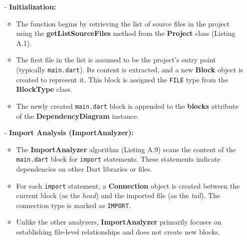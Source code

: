 \begin{itemize}
    \item[-] \textbf{Initialization:}
    \begin{itemize}
        \item The function begins by retrieving the list of source files in the project using the \textbf{getListSourceFiles} method from the \textbf{Project} class (Listing A.1).
        \item The first file in the list is assumed to be the project's entry point (typically \texttt{main.dart}). Its content is extracted, and a new \textbf{Block} object is created to represent it. This block is assigned the \texttt{FILE} type from the \textbf{BlockType} class.
        \item The newly created \texttt{main.dart} block is appended to the \textbf{blocks} attribute of the \textbf{DependencyDiagram} instance.
    \end{itemize}

    \item[-] \textbf{Import Analysis (ImportAnalyzer):}
    \begin{itemize}
        \item The \textbf{ImportAnalyzer} algorithm (Listing A.9) scans the content of the \texttt{main.dart} block for \texttt{import} statements. These statements indicate dependencies on other Dart libraries or files.
        \item For each \texttt{import} statement, a \textbf{Connection} object is created between the current block (as the \textit{head}) and the imported file (as the \textit{tail}). The connection type is marked as \texttt{IMPORT}.
        \item Unlike the other analyzers, \textbf{ImportAnalyzer} primarily focuses on establishing file-level relationships and does not create new blocks.
    \end{itemize}


\end{itemize}
